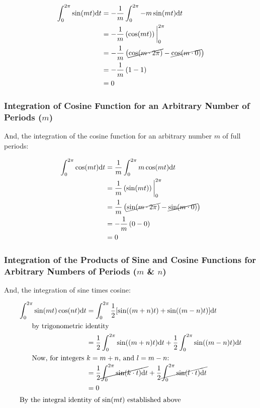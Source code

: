\documentclass[10pt]{article} %
\begin{document}
\begin{align*}
    \int_0^{2\pi} \sin(mt)\mathrm{d}t & = -\frac1m\int_0^{2\pi}-m\sin(mt)\mathrm{d}t \\
    & = -\frac1m\left(\cos(mt)\right)\bigg\rvert_0^{2\pi} \\
    & = -\frac1m\left(\cancel{\cos(m\cdot2\pi)} - \cancel{\cos(m\cdot 0)}\right) \\
    & = -\frac1m\left(1 - 1\right) \\
    & = 0
\end{align*}

\subsubsection{Integration of Cosine Function for an Arbitrary Number of Periods ($m$)}

And, the integration of the cosine function for an arbitrary number $m$ of full periods:

\begin{align*}
    \int_0^{2\pi} \cos(mt)\mathrm{d}t & = \frac1m\int_0^{2\pi}m\cos(mt)\mathrm{d}t \\
    & = \frac1m\left(\sin(mt)\right)\bigg\rvert_0^{2\pi} \\
    & = \frac1m\left(\cancel{\sin(m\cdot2\pi)} - \cancel{\sin(m\cdot 0)}\right) \\
    & = -\frac1m\left(0 - 0\right) \\
    & = 0
\end{align*}

\subsubsection{Integration of the Products of Sine and Cosine Functions for Arbitrary Numbers of Periods ($m$ \& $n$)}


And, the integration of sine times cosine:

\begin{align*}
    \int_0^{2\pi}\sin(mt)\cos(nt)\mathrm{d}t & = \int_0^{2\pi}\frac12[\sin((m+n)t) +\sin((m-n)t)]\mathrm{d}t \\
    \intertext{\hspace{0.5cm} by trigonometric identity}
    & = \frac12 \int_0^{2\pi}\sin((m+n)t)\mathrm{d}t + \frac12 \int_0^{2\pi}\sin((m-n)t)\mathrm{d}t\\
    \intertext{\hspace{0.5cm} Now, for integers $k=m+n$, and $l=m-n$:}
    & = \frac12 \cancel{\int_0^{2\pi}\sin(k\cdot t)\mathrm{d}t} + \frac12 \cancel{\int_0^{2\pi}\sin(l\cdot t)\mathrm{d}t} \\
    & = 0 \\
    \intertext{By the integral identity of $\sin(mt)$ established above}
\end{align*}
\end{document}
